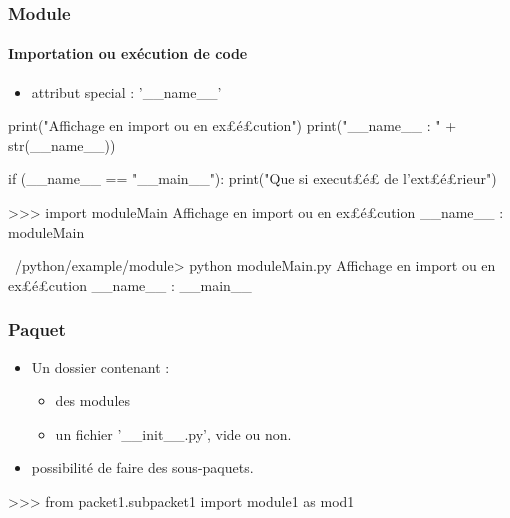 \begin{frame}[fragile]
\frametitle{Module}
\framesubtitle{Importation ou exécution de code}
\begin{itemize}
\item attribut special : '\_\_name\_\_'
\end{itemize}
\begin{python}
print("Affichage en import ou en ex£{\color{magenta}\'e}£cution")
print("__name__ : " + str(__name__))

if (__name__ == "__main__"): 
    print("Que si execut£{\color{magenta}\'e}£ de l'ext£{\color{magenta}\'e}£rieur")
\end{python}
\begin{pythonConsole}
>>> import moduleMain
Affichage en import ou en ex£\'e£cution
__name__ : moduleMain
\end{pythonConsole}
\begin{shell}
~/python/example/module> python moduleMain.py
Affichage en import ou en ex£é£cution
__name__ : __main__
\end{shell}
\end{frame}
\begin{frame}[fragile]
\frametitle{Paquet}
\begin{itemize}
 \item Un dossier contenant : 
 \begin{itemize} 
  \item des modules
  \item un fichier '\_\_init\_\_.py', vide ou non.
 \end{itemize}
 \item possibilité de faire des sous-paquets.  
\end{itemize}
\begin{pythonConsole}
>>> from packet1.subpacket1 import module1 as mod1
\end{pythonConsole}
\begin{center}
\end{center}
\end{frame}
